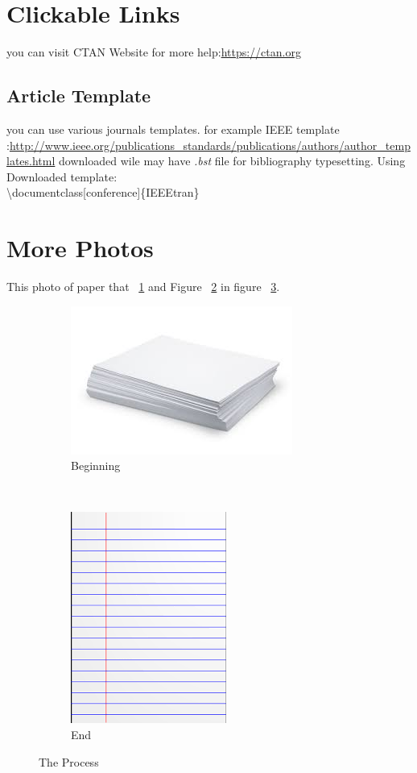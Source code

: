 \documentclass{article}
\begin{document}
	\section{Clickable Links}
		you can visit CTAN Website for more help:\url{https://ctan.org}
		\subsection{Article Template}
			you can use various journals templates. for example IEEE template :\url{http://www.ieee.org/publications_standards/publications/authors/author_templates.html} downloaded wile may have \emph{.bst} file for bibliography typesetting. Using Downloaded template:\\
			\textbackslash documentclass[conference]\{IEEEtran\}
	\section{More Photos}
		This photo of paper that ~\ref{fig:paper} and Figure ~\ref{fig:page} in figure ~\ref{fig:subs}.
		\begin{figure}[htp]
			\begin{center}
				\begin{subfigure}[b]{0.2\textwidth}
					\centering%
					\includegraphics[scale=0.8]{paper.jpeg}
					\caption{Beginning}\label{fig:paper}
				\end{subfigure}
				\\
				\begin{subfigure}[b]{0.2\textwidth}
					\centering
					\includegraphics[scale=0.7]{page.png}
					\caption{End}
					\label{fig:page}
				\end{subfigure}
				\caption{The Process}
				\label{fig:subs}
			\end{center}
		\end{figure}
\end{document}
